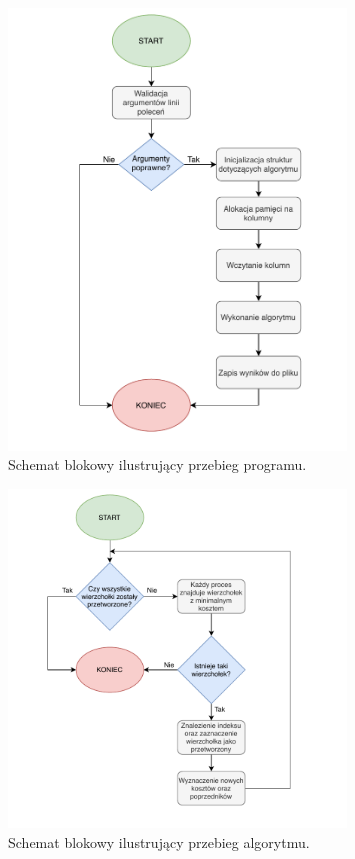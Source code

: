 \documentclass[12pt]{article}
\begin{document}
\begin{figure}[H]
\centering
\includegraphics[width=0.8\textwidth]{diagram1.pdf}
\caption{Schemat blokowy ilustrujący przebieg programu.}
\end{figure}

\begin{figure}[H]
\centering
\includegraphics[width=0.8\textwidth]{diagram2.pdf}
\caption{Schemat blokowy ilustrujący przebieg algorytmu.}
\end{figure}
\end{document}

